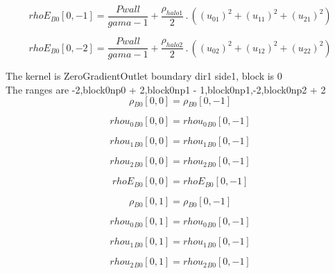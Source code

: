 \documentclass{article}
\begin{document}
\begin{dmath}{rhoE{_{B0}}}[{0,-1}] = \frac{Pwall}{gama - 1} + \frac{\rho_{halo 1}}{2} \,.\, \left(\left(u_{01} \right)^{2} + \left(u_{11} \right)^{2} + \left(u_{21} \right)^{2}\right)\end{dmath}

\begin{dmath}{rhoE{_{B0}}}[{0,-2}] = \frac{Pwall}{gama - 1} + \frac{\rho_{halo 2}}{2} \,.\, \left(\left(u_{02} \right)^{2} + \left(u_{12} \right)^{2} + \left(u_{22} \right)^{2}\right)\end{dmath}

\noindent The kernel is ZeroGradientOutlet boundary dir1 side1, block is 0\\\noindent The ranges are -2,block0np0 + 2,block0np1 - 1,block0np1,-2,block0np2 + 2\\\begin{dmath}{\rho{_{B0}}}[{0,0}] = {\rho{_{B0}}}[{0,-1}]\end{dmath}

\begin{dmath}{rhou_{0}{_{B0}}}[{0,0}] = {rhou_{0}{_{B0}}}[{0,-1}]\end{dmath}

\begin{dmath}{rhou_{1}{_{B0}}}[{0,0}] = {rhou_{1}{_{B0}}}[{0,-1}]\end{dmath}

\begin{dmath}{rhou_{2}{_{B0}}}[{0,0}] = {rhou_{2}{_{B0}}}[{0,-1}]\end{dmath}

\begin{dmath}{rhoE{_{B0}}}[{0,0}] = {rhoE{_{B0}}}[{0,-1}]\end{dmath}

\begin{dmath}{\rho{_{B0}}}[{0,1}] = {\rho{_{B0}}}[{0,-1}]\end{dmath}

\begin{dmath}{rhou_{0}{_{B0}}}[{0,1}] = {rhou_{0}{_{B0}}}[{0,-1}]\end{dmath}

\begin{dmath}{rhou_{1}{_{B0}}}[{0,1}] = {rhou_{1}{_{B0}}}[{0,-1}]\end{dmath}

\begin{dmath}{rhou_{2}{_{B0}}}[{0,1}] = {rhou_{2}{_{B0}}}[{0,-1}]\end{dmath}
\end{document}
